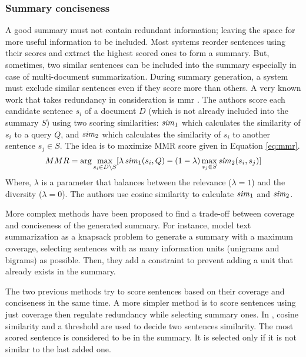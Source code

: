 \subsubsection{Summary conciseness}

A good summary must not contain redundant information; leaving the space for more useful information to be included. 
Most systems reorder sentences using their scores and extract the highest scored ones to form a summary.
But, sometimes, two similar sentences can be included into the summary especially in case of multi-document summarization.
During summary generation, a system must exclude similar sentences even if they score more than others.
A very known work that takes redundancy in consideration is \ac{mmr} \citep{98-carbonell-goldstein}.
The authors score each candidate sentence $ s_i $ of a document $ D $ (which is not already included into the summary $ S $) using two scoring similarities: $ \text{\textit{sim}}_1 $ which calculates the similarity of $ s_i $ to a query $ Q $, and $ \text{\textit{sim}}_2 $ which calculates the similarity of $ s_i $ to another sentence $ s_j \in S $.
The idea is to maximize MMR score given in Equation \ref{eq:mmr}.
\begin{equation}
	\label{eq:mmr}
	MMR = \arg \max \limits_{s_i \in D\backslash S} [ \lambda\, \text{\textit{sim}}_1 (s_i, Q) - (1-\lambda) \max\limits_{s_j \in S} \text{\textit{sim}}_2 (s_i, s_j)]
\end{equation}
Where, $ \lambda $ is a parameter that balances between the relevance ($ \lambda = 1 $) and the diversity ($ \lambda = 0 $).
The authors use cosine similarity to calculate $ \text{\textit{sim}}_1 $ and $ \text{\textit{sim}}_2 $.
%

More complex methods have been proposed to find a trade-off between coverage and conciseness of the generated summary.
For instance, \citet{12-nishikawa-al} model text summarization as a knapsack problem to generate a summary with a maximum coverage, selecting sentences with as many information units (unigrams and bigrams) as possible.
Then, they add a constraint to prevent adding a unit that already exists in the summary.

The two previous methods try to score sentences based on their coverage and conciseness in the same time.
A more simpler method is to score sentences using just coverage then regulate redundancy while selecting summary ones.
In \citep{15-aries-al}, cosine similarity and a threshold are used to decide two sentences similarity. 
The most scored sentence is considered to be in the summary.
It is selected only if it is not similar to the last added one.

